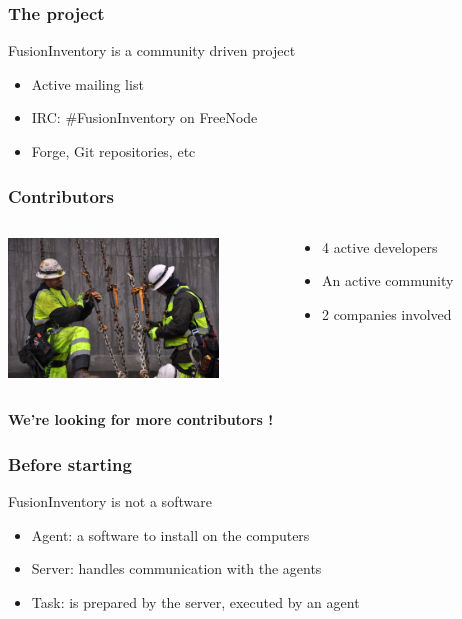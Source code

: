 \documentclass{beamer}
\begin{document}
\begin{frame}
    \frametitle{The project}
    FusionInventory is a community driven project

    \begin{itemize}
        \item Active mailing list
        \item IRC: \#FusionInventory on FreeNode
        \item Forge, Git repositories, etc
    \end{itemize}
\end{frame}


\begin{frame}
    \frametitle{Contributors}

 \begin{columns}
 \begin{column}[T]{4cm}
    \includegraphics[height=3.7cm]{./pics/worker.jpg}
 \end{column}
 \begin{column}[t]{5cm}
    \begin{itemize}
    \item 4 active developers
    \item An active community
    \item 2 companies involved
    \end{itemize}

 \end{column}
\end{columns}

    \pause
    \bf{We're looking for more contributors !}
\end{frame}



\begin{frame}
    \frametitle{Before starting}

    \begin{block}{FusionInventory is not a software}
    \begin{itemize}
        \item Agent: a software to install on the computers
        \item Server: handles communication with the agents
        \item Task: is prepared by the server, executed by an agent
    \end{itemize}
    \end{block}

\end{frame}
\end{document}
